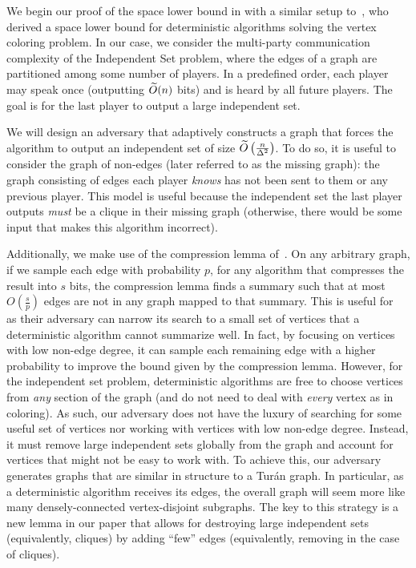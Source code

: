 \documentclass[11pt]{article}
\begin{document}
We begin our proof of the space lower bound in  with a similar setup to~\cite{assadi2022deterministic}, who derived a space lower bound for deterministic algorithms solving the vertex coloring problem. In our case, we consider the multi-party communication complexity of the Independent Set problem, where the edges of a graph are partitioned among some number of players. In a predefined order, each player may speak once (outputting $\widetilde{O}(n)$ bits) and is heard by all future players. The goal is for the last player to output a large independent set. 

We will design an adversary that adaptively constructs a graph that forces the algorithm to output an independent set of size $\widetilde{O}\left(\frac n{\Delta^2}\right)$. To do so, it is useful to consider the graph of non-edges (later referred to as the missing graph): the graph consisting of edges each player \textit{knows} has not been sent to them or any previous player. This model is useful because the independent set the last player outputs \textit{must} be a clique in their missing graph (otherwise, there would be some input that makes this algorithm incorrect). 

Additionally, we make use of the compression lemma of~\cite{assadi2022deterministic}. On any arbitrary graph, if we sample each edge with probability $p$, for any algorithm that compresses the result into $s$ bits, the compression lemma finds a summary such that at most $O\left(\frac sp\right)$ edges are not in any graph mapped to that summary. This is useful for\ \cite{assadi2022deterministic} as their adversary can narrow its search to a small set of vertices that a deterministic algorithm cannot summarize well. In fact, by focusing on vertices with low non-edge degree, it can sample each remaining edge with a higher probability to improve the bound given by the compression lemma. However, for the independent set problem, deterministic algorithms are free to choose vertices from \textit{any} section of the graph (and do not need to deal with \textit{every} vertex as in coloring). As such, our adversary does not have the luxury of searching for some useful set of vertices nor working with vertices with low non-edge degree. Instead, it must remove large independent sets globally from the graph and account for vertices that might not be easy to work with. To achieve this, our adversary generates graphs that are similar in structure to a Tur\'an graph. In particular, as a deterministic algorithm receives its edges, the overall graph will seem more like many densely-connected vertex-disjoint subgraphs. The key to this strategy is a new lemma in our paper that allows for destroying large independent sets (equivalently, cliques) by adding ``few'' edges (equivalently, removing in the case of cliques).
\end{document}

